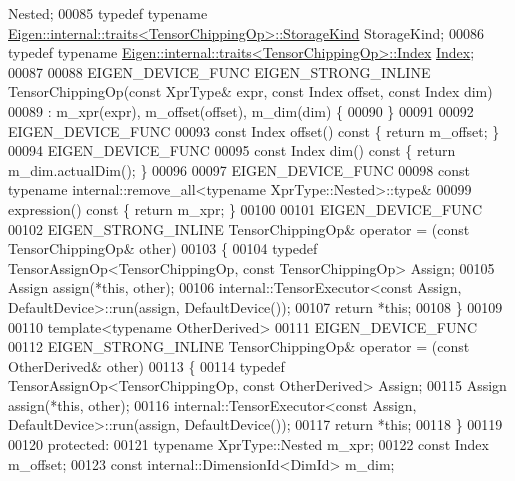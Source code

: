 \begin{DoxyCode}
       Nested;
00085   \textcolor{keyword}{typedef} \textcolor{keyword}{typename} \hyperlink{struct_eigen_1_1internal_1_1traits}{Eigen::internal::traits<TensorChippingOp>::StorageKind}
       StorageKind;
00086   \textcolor{keyword}{typedef} \textcolor{keyword}{typename} \hyperlink{struct_eigen_1_1internal_1_1traits}{Eigen::internal::traits<TensorChippingOp>::Index}
       \hyperlink{namespace_eigen_a62e77e0933482dafde8fe197d9a2cfde}{Index};
00087 
00088   EIGEN\_DEVICE\_FUNC EIGEN\_STRONG\_INLINE TensorChippingOp(\textcolor{keyword}{const} XprType& expr, \textcolor{keyword}{const} Index offset, \textcolor{keyword}{const} 
      Index dim)
00089       : m\_xpr(expr), m\_offset(offset), m\_dim(dim) \{
00090   \}
00091 
00092   EIGEN\_DEVICE\_FUNC
00093   \textcolor{keyword}{const} Index offset()\textcolor{keyword}{ const }\{ \textcolor{keywordflow}{return} m\_offset; \}
00094   EIGEN\_DEVICE\_FUNC
00095   \textcolor{keyword}{const} Index dim()\textcolor{keyword}{ const }\{ \textcolor{keywordflow}{return} m\_dim.actualDim(); \}
00096 
00097   EIGEN\_DEVICE\_FUNC
00098   \textcolor{keyword}{const} \textcolor{keyword}{typename} internal::remove\_all<typename XprType::Nested>::type&
00099   expression()\textcolor{keyword}{ const }\{ \textcolor{keywordflow}{return} m\_xpr; \}
00100 
00101   EIGEN\_DEVICE\_FUNC
00102   EIGEN\_STRONG\_INLINE TensorChippingOp& operator = (\textcolor{keyword}{const} TensorChippingOp& other)
00103   \{
00104     \textcolor{keyword}{typedef} TensorAssignOp<TensorChippingOp, const TensorChippingOp> Assign;
00105     Assign assign(*\textcolor{keyword}{this}, other);
00106     internal::TensorExecutor<const Assign, DefaultDevice>::run(assign, DefaultDevice());
00107     \textcolor{keywordflow}{return} *\textcolor{keyword}{this};
00108   \}
00109 
00110   \textcolor{keyword}{template}<\textcolor{keyword}{typename} OtherDerived>
00111   EIGEN\_DEVICE\_FUNC
00112   EIGEN\_STRONG\_INLINE TensorChippingOp& operator = (\textcolor{keyword}{const} OtherDerived& other)
00113   \{
00114     \textcolor{keyword}{typedef} TensorAssignOp<TensorChippingOp, const OtherDerived> Assign;
00115     Assign assign(*\textcolor{keyword}{this}, other);
00116     internal::TensorExecutor<const Assign, DefaultDevice>::run(assign, DefaultDevice());
00117     \textcolor{keywordflow}{return} *\textcolor{keyword}{this};
00118   \}
00119 
00120   \textcolor{keyword}{protected}:
00121     \textcolor{keyword}{typename} XprType::Nested m\_xpr;
00122     \textcolor{keyword}{const} Index m\_offset;
00123     \textcolor{keyword}{const} internal::DimensionId<DimId> m\_dim;

\end{DoxyCode}

